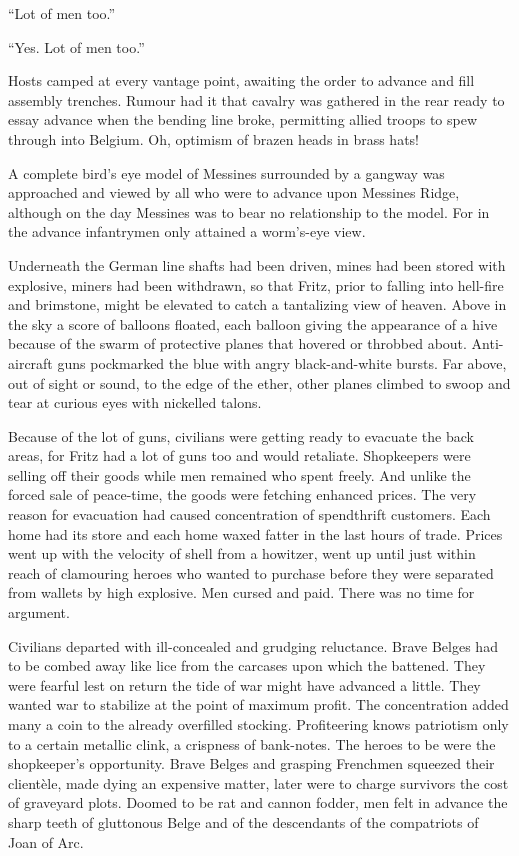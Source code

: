 ``Lot of men too.''

``Yes. Lot of men too.''

Hosts camped at every vantage point, awaiting the order to advance and fill assembly trenches. Rumour had it that cavalry was gathered in the rear ready to essay advance when the bending line broke, permitting allied troops to spew through into Belgium. Oh, optimism of brazen heads in brass hats!

A complete bird's eye model of Messines surrounded by a gangway was approached and viewed by all who were to advance upon Messines Ridge, although on the day Messines was to bear no relationship to the model. For in the advance infantrymen only attained a worm's-eye view.

Underneath the German line shafts had been driven, mines had been stored with explosive, miners had been withdrawn, so that Fritz, prior to falling into hell-fire and brimstone, might be elevated to catch a tantalizing view of heaven. Above in the sky a score of balloons floated, each balloon giving the appearance of a hive because of the swarm of protective planes that hovered or throbbed about. Anti-aircraft guns pockmarked the blue with angry black-and-white bursts. Far above, out of sight or sound, to the edge of the ether, other planes climbed to swoop and tear at curious eyes with nickelled talons.

Because of the lot of guns, civilians were getting ready to evacuate the back areas, for Fritz had a lot of guns too and would retaliate. Shopkeepers were selling off their goods while men remained who spent freely. And unlike the forced sale of peace-time, the goods were fetching enhanced prices. The very reason for evacuation had caused concentration of spendthrift customers. Each home had its store and each home waxed fatter in the last hours of trade. Prices went up with the velocity of shell from a howitzer, went up until just within reach of clamouring heroes who wanted to purchase before they were separated from wallets by high explosive. Men cursed and paid. There was no time for argument.

Civilians departed with ill-concealed and grudging reluctance. Brave Belges had to be combed away like lice from the carcases upon which the battened. They were fearful lest on return the tide of war might have advanced a little. They wanted war to stabilize at the point of maximum profit. The concentration added many a coin to the already overfilled stocking. Profiteering knows patriotism only to a certain metallic clink, a crispness of bank-notes. The heroes to be were the shopkeeper's opportunity. Brave Belges and grasping Frenchmen squeezed their client\`{e}le, made dying an expensive matter, later were to charge survivors the cost of graveyard plots. Doomed to be rat and cannon fodder, men felt in advance the sharp teeth of gluttonous Belge and of the descendants of the compatriots of Joan of Arc.


